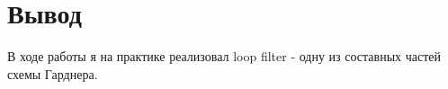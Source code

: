 \chapter{Вывод}
\label{ch:chap3}

В ходе работы я на практике реализовал loop filter - одну из составных частей схемы Гарднера.
\endinput
